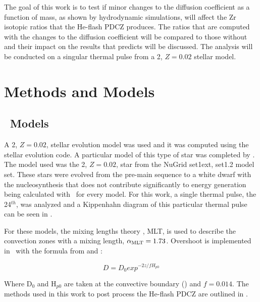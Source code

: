 \documentclass[fleqn,usenatbib]{mnras}
\begin{document}
The goal of this work is to test if minor changes to the diffusion coefficient as a function of mass, as shown by hydrodynamic simulations, will affect the Zr isotopic ratios that the He-flash PDCZ produces. The ratios that are computed with the changes to the diffusion coefficient will be compared to those without and their impact on the results that \citet{zr} predicts will be discussed. The analysis will be conducted on a singular thermal pulse from a 2\Msun, $Z=0.02$ stellar model.

\section{Methods and Models}

\subsection{\MESA~Models}
\label{sec:mesa_models} %

A 2\Msun, $Z=0.02$, stellar evolution model was used and it was computed using the \MESA~\citep{mesa} stellar evolution code. A particular model of this type of star was completed by \citep{models}. The model used was the 2\Msun, $Z=0.02$, star from the NuGrid set1ext, set1.2 model set. These stars were evolved from the pre-main sequence to a white dwarf with the nucleosynthesis that does not contribute significantly to energy generation being calculated with \mppnp~for every model. For this work, a single thermal pulse, the 24$^{th}$, was analyzed and a Kippenhahn diagram of this particular thermal pulse can be seen in . 

For these models, the mixing lengths theory \citep{cox}, MLT, is used to describe the convection zones with a mixing length, $\alpha_{\mathrm{MLT}}=1.73$. Overshoot is implemented in \MESA~with the formula from \citet{overshoot} and \citet{freytag}:

\begin{equation}
D = D_{0} exp^{-2z/f H_{p0}}
\label{eq:overshoot}
\end{equation} 

\noindent Where D$_{0}$ and H$_{p0}$ are taken at the convective boundary () and $f=0.014$. The methods used in this work to post process the He-flash PDCZ are outlined in .
\end{document}

